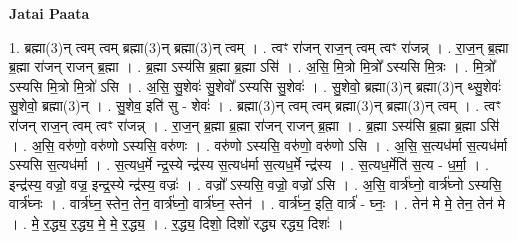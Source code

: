\documentclass[17pt]{extarticle}
\begin{document}
\textbf{Jatai Paata} \newline

1. ब्रह्मा(3)न् त्वम् त्वम् ब्रह्मा(3)न् ब्रह्मा(3)न् त्वम् । . त्वꣳ रा॑जन् राज॒न् त्वम् त्वꣳ रा॑जन्न् । . रा॒ज॒न् ब्र॒ह्मा ब्र॒ह्मा रा॑जन् राजन् ब्र॒ह्मा । . ब्र॒ह्मा ऽस्य॑सि ब्र॒ह्मा ब्र॒ह्मा ऽसि॑ । . अ॒सि॒ मि॒त्रो मि॒त्रो᳚ ऽस्यसि मि॒त्रः । . मि॒त्रो᳚ ऽस्यसि मि॒त्रो मि॒त्रो॑ ऽसि । . अ॒सि॒ सु॒शेवः॑ सु॒शेवो᳚ ऽस्यसि सु॒शेवः॑ । . सु॒शेवो॒ ब्रह्मा(3)न् ब्रह्मा(3)न् थ्सु॒शेवः॑ सु॒शेवो॒ ब्रह्मा(3)न् । . सु॒शेव॒ इति॑ सु - शेवः॑ । . ब्रह्मा(3)न् त्वम् त्वम् ब्रह्मा(3)न् ब्रह्मा(3)न् त्वम् । . त्वꣳ रा॑जन् राज॒न् त्वम् त्वꣳ रा॑जन्न् । . रा॒ज॒न् ब्र॒ह्मा ब्र॒ह्मा रा॑जन् राजन् ब्र॒ह्मा । . ब्र॒ह्मा ऽस्य॑सि ब्र॒ह्मा ब्र॒ह्मा ऽसि॑ । . अ॒सि॒ वरु॑णो॒ वरु॑णो ऽस्यसि॒ वरु॑णः । . वरु॑णो ऽस्यसि॒ वरु॑णो॒ वरु॑णो ऽसि । . अ॒सि॒ स॒त्यध॑र्मा स॒त्यध॑र्मा ऽस्यसि स॒त्यध॑र्मा । . स॒त्यध॒र्मे न्द्र॒स्ये न्द्र॑स्य स॒त्यध॑र्मा स॒त्यध॒र्मे न्द्र॑स्य । . स॒त्यध॒र्मेति॑ स॒त्य - ध॒र्मा॒ । . इन्द्र॑स्य॒ वज्रो॒ वज्र॒ इन्द्र॒स्ये न्द्र॑स्य॒ वज्रः॑ । . वज्रो᳚ ऽस्यसि॒ वज्रो॒ वज्रो॑ ऽसि । . अ॒सि॒ वार्त्र॑घ्नो॒ वार्त्र॑घ्नो ऽस्यसि॒ वार्त्र॑घ्नः । . वार्त्र॑घ्न॒ स्तेन॒ तेन॒ वार्त्र॑घ्नो॒ वार्त्र॑घ्न॒ स्तेन॑ । . वार्त्र॑घ्न॒ इति॒ वार्त्र॑ - घ्नः॒ । . तेन॑ मे मे॒ तेन॒ तेन॑ मे । . मे॒ र॒द्ध्य॒ र॒द्ध्य॒ मे॒ मे॒ र॒द्ध्य॒ । . र॒द्ध्य॒ दिशो॒ दिशो॑ रद्ध्य रद्ध्य॒ दिशः॑ । \newline
\end{document}
